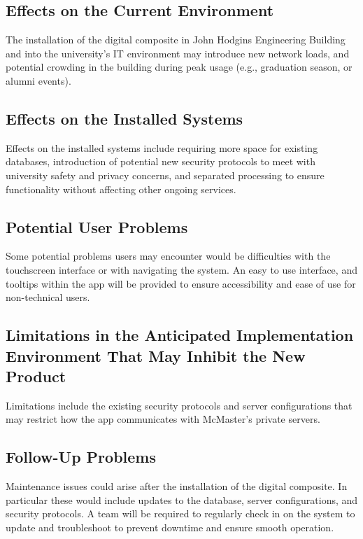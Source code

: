 \documentclass[12pt]{article}
\begin{document}
\subsection{Effects on the Current Environment}

The installation of the digital composite in John Hodgins Engineering Building and into the university’s IT environment may introduce new network loads, and potential crowding in the building during peak usage (e.g., graduation season, or alumni events).

\subsection{Effects on the Installed Systems}

Effects on the installed systems include requiring more space for existing databases, introduction of potential new security protocols to meet with university safety and privacy concerns, and separated processing to ensure functionality without affecting other ongoing services.

\subsection{Potential User Problems}

Some potential problems users may encounter would be difficulties with the touchscreen interface or with navigating the system. An easy to use interface, and tooltips within the app will be provided to ensure accessibility and ease of use for non-technical users.

\subsection{Limitations in the Anticipated Implementation Environment That May Inhibit the New Product}

Limitations include the existing security protocols and server configurations that may restrict how the app communicates with McMaster’s private servers.

\subsection{Follow-Up Problems}

Maintenance issues could arise after the installation of the digital composite. In particular these would include updates to the database, server configurations, and security protocols. A team will be required to regularly check in on the system to update and troubleshoot to prevent downtime and ensure smooth operation.
\end{document}
